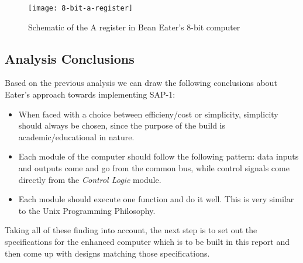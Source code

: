 \begin{figure}[ht]
  \centering
  \texttt{[image: 8-bit-a-register]}
  \caption{Schematic of the A register in Bean Eater's 8-bit computer \cite{eater2019highlevel}}
  \label{8-bit-a-register}
\end{figure}

\subsection{Analysis Conclusions}
Based on the previous analysis we can draw the following conclusions about Eater's approach towards implementing SAP-1:

\begin{itemize}
  \item When faced with a choice between efficieny/cost or simplicity, simplicity should always be chosen, since the purpose of the build is academic/educational in nature.
  \item Each module of the computer should follow the following pattern: data inputs and outputs come and go from the common bus,
  while control signals come directly from the \emph{Control Logic} module.
  \item Each module should execute one function and do it well. This is very similar to the Unix Programming Philosophy.
\end{itemize}

Taking all of these finding into account, the next step is to set out the specifications for the enhanced computer which is to be built in this report and then come up with designs matching those specifications.

